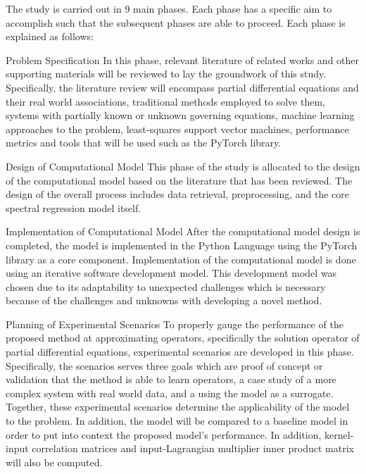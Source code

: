The study is carried out in 9 main phases. Each phase has a specific aim to accomplish such that the subsequent phases are able to proceed. Each phase is explained as follows:
\begin{numdesc}
      \item[Problem Specification]
      In this phase, relevant literature of related works and other supporting materials will be reviewed to lay the groundwork of this study. Specifically, the literature review will encompass partial differential equations and their real world associations, traditional methods employed to solve them, systems with partially known or unknown governing equations, machine learning approaches to the problem, least-squares support vector machines, performance metrics and tools that will be used such as the PyTorch library.

      \item[Design of Computational Model]
      This phase of the study is allocated to the design of the computational model based on the literature that has been reviewed. The design of the overall process includes data retrieval, preprocessing, and the core spectral regression model itself.

      \item[Implementation of Computational Model]
      After the computational model design is completed, the model is implemented in the Python Language using the PyTorch library as a core component. Implementation of the computational model is done using an iterative software development model. This development model was chosen due to its adaptability to unexpected challenges which is necessary because of the challenges and unknowns with developing a novel method.

      \item[Planning of Experimental Scenarios]
      To properly gauge the performance of the proposed method at approximating operators, specifically the solution operator of partial differential equations, experimental scenarios are developed in this phase. Specifically, the scenarios serves three goals which are proof of concept or validation that the method is able to learn operators, a case study of a more complex system with real world data, and a using the model as a surrogate. Together, these experimental scenarios determine the applicability of the model to the problem. In addition, the model will be compared to a baseline model in order to put into context the proposed model's performance. In addition, kernel-input correlation matrices and input-Lagrangian multiplier inner product matrix will also be computed.


\end{numdesc}

